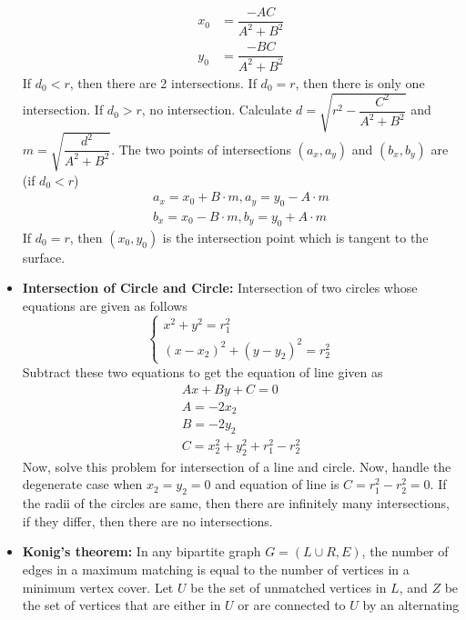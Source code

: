 \documentclass[15pt,a4paper]{article}
\begin{document}
\begin{landscape}
\begin{multicols*}{3}
\begin{itemize}
        \begin{align*}
            x_0 &= \dfrac{-AC}{A^2 + B^2}\\
            y_0 &= \dfrac{-BC}{A^2 + B^2}
        \end{align*}
    If $d_0 < r$, then there are 2 intersections. If $d_0 = r$, then there is only one intersection. If $d_0 > r$, no intersection. Calculate $d = \sqrt{r^2 - \dfrac{C^2}{A^2 + B^2}}$ and $m = \sqrt{\dfrac{d^2}{A^2 + B^2}}$. The two points of intersections $(a_x, a_y)$ and $(b_x, b_y)$ are (if $d_0 < r$)
        \begin{gather*}
            a_x = x_0 + B \cdot m, a_y = y_0 - A  \cdot m\\
            b_x = x_0 - B\cdot m, b_y = y_0 + A\cdot m
        \end{gather*}
    If $d_0 = r$, then $(x_0, y_0)$ is the intersection point which is tangent to the surface.
    \item \textbf{Intersection of Circle and Circle:} Intersection of two circles whose equations are given as follows
        \begin{equation*}
                \begin{cases*}
                    x^2 + y^2 = r_1^2\\
                    (x - x_2)^2 + (y - y_2)^2 = r_2^2
                \end{cases*}
        \end{equation*}
        Subtract these two equations to get the equation of line given as
        \begin{gather*}
            Ax + By + C = 0\\
            A = -2x_2\\
            B = -2y_2\\
            C = x_2^2 + y_2^2 + r_1^2 - r_2^2
        \end{gather*}
    Now, solve this problem for intersection of a line and circle.
    Now, handle the degenerate case when $x_2 = y_2 = 0$ and equation of line is $C = r_1^2 - r_2^2 = 0$. If the radii of the circles are same, then there are infinitely many intersections, if they differ, then there are no intersections.
    \item \textbf{Konig's theorem:} In any bipartite graph $G=(L\cup R,E)$, the number
    of edges in a maximum matching is equal to the number of
    vertices in a minimum vertex cover. Let $U$ be the set of
    unmatched vertices in $L$, and $Z$ be the set of vertices that
    are either in $U$ or are connected to $U$ by an alternating

\end{itemize}
\end{multicols*}
\end{landscape}
\end{document}
